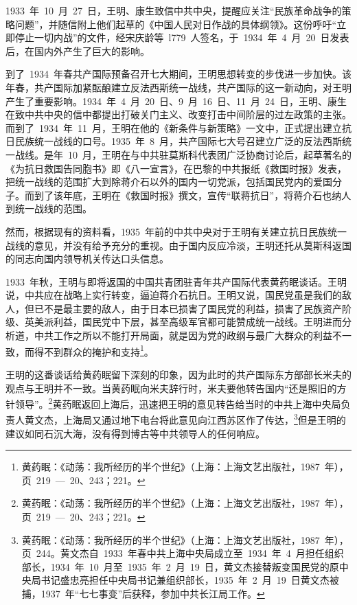 1933~年~10~月~27~日，王明、康生致信中共中央，提醒应关注“民族革命战争的策略问题”，并随信附上他们起草的《中国人民对日作战的具体纲领》。这份呼吁“立即停止一切内战”的文件，经宋庆龄等~l779~人签名，于~1934~年~4~月~20~日发表后，在国内外产生了巨大的影响。

到了~1934~年春共产国际预备召开七大期间，王明思想转变的步伐进一步加快。该年春，共产国际加紧酝酿建立反法西斯统一战线，共产国际的这一新动向，对王明产生了重要影响。1934~年~4~月~20~日、9~月~16~日、11~月~24~日，王明、康生在致中共中央的信中都提出打破关门主义、改变打击中间阶层的过左政策的主张。而到了~1934~年~11~月，王明在他的《新条件与新策略》一文中，正式提出建立抗日民族统一战线的口号。1935~年~8~月，共产国际七大号召建立广泛的反法西斯统一战线。是年~10~月，王明在与中共驻莫斯科代表团广泛协商讨论后，起草著名的《为抗日救国告同胞书》即《八一宣言》，在巴黎的中共报纸《救国时报》发表，把统一战线的范围扩大到除蒋介石以外的国内一切党派，包括国民党内的爱国分子。而到了该年底，王明在《救国时报》撰文，宣传“联蒋抗日”，将蒋介石也纳人到统一战线的范围。

然而，根据现有的资料看，1935~年前的中共中央对于王明有关建立抗日民族统一战线的意见，并没有给予充分的重视。由于国内反应冷淡，王明还托从莫斯科返国的同志向国内领导机关传达口头信息。

1933~年秋，王明与即将返国的中国共青团驻青年共产国际代表黄药眠谈话。王明说，中共应在战略上实行转变，逼迫蒋介石抗日。王明又说，国民党虽是我们的敌人，但已不是最主要的敌人，由于日本已损害了国民党的利益，损害了民族资产阶级、英美派利益，国民党中下层，甚至高级军官都可能赞成统一战线。王明进而分析道，中共工作之所以不能打开局面，就是因为党的政纲与最广大群众的利益不一致，而得不到群众的掩护和支持\footnote{黄药眠：《动荡：我所经历的半个世纪》（上海：上海文艺出版社，1987~年），页~219~—~20、243；221。}。

王明的这番谈话给黄药眠留下深刻的印象，因为此时的共产国际东方部部长米夫的观点与王明并不一致。当黄药眠向米夫辞行时，米夫要他转告国内“还是照旧的方针领导”。\footnote{黄药眠：《动荡：我所经历的半个世纪》（上海：上海文艺出版社，1987~年），页~219~—~20、243；221。}黄药眠返回上海后，迅速把王明的意见转告给当时的中共上海中央局负责人黄文杰，上海局又通过地下电台将此意见向江西苏区作了传达，\footnote{黄药眠：《动荡：我所经历的半个世纪》（上海：上海文艺出版社，1987~年），页~244。黄文杰自~1933~年春中共上海中央局成立至~1934~年~4~月担任组织部长，1934~年~10~月至~1935~年~2~月~19~日，黄文杰接替叛变国民党的原中央局书记盛忠亮担任中央局书记兼组织部长，1935~年~2~月~19~日黄文杰被捕，1937~年“七七事变”后获释，参加中共长江局工作。}但是王明的建议如同石沉大海，没有得到博古等中共领导人的任何响应。


